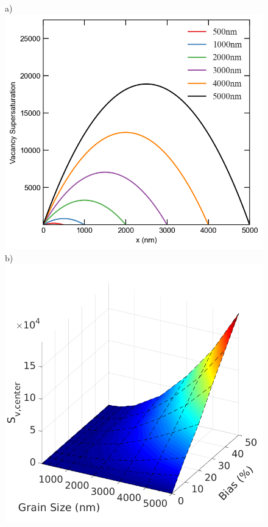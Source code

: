 \documentclass[utf8]{frontiersSCNS} %
\begin{document}
        \begin{figure}[h!]  %
        \centering
        a)\includegraphics[scale=0.55]{super_saturation_500-5000nm-neutron-5}
        b)\includegraphics[scale=0.38]{data_neutron_Sv_center}

\end{figure}
\end{document}
